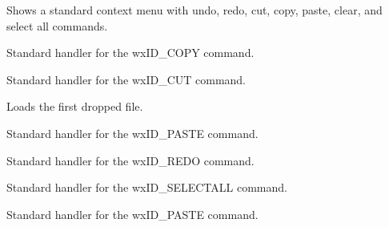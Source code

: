 \label{wxrichtextctrloncontextmenu}


Shows a standard context menu with undo, redo, cut, copy, paste, clear, and select all commands.

\label{wxrichtextctrloncopy}


Standard handler for the wxID\_COPY command.

\label{wxrichtextctrloncut}


Standard handler for the wxID\_CUT command.

\label{wxrichtextctrlondropfiles}


Loads the first dropped file.

\label{wxrichtextctrlonpaste}


Standard handler for the wxID\_PASTE command.

\label{wxrichtextctrlonredo}


Standard handler for the wxID\_REDO command.

\label{wxrichtextctrlonselectall}


Standard handler for the wxID\_SELECTALL command.

\label{wxrichtextctrlonundo}


Standard handler for the wxID\_PASTE command.

\label{wxrichtextctrlonupdateclear}


